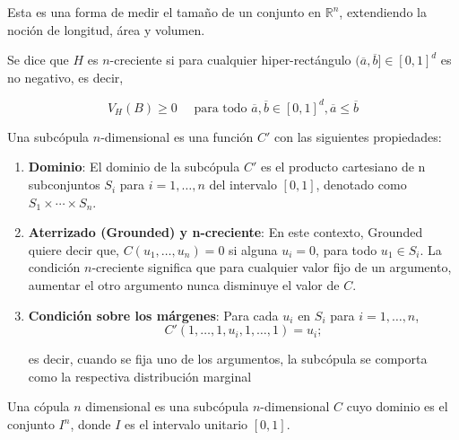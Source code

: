Esta es una forma de medir el tamaño de un conjunto en $\mathbb{R}^n$, extendiendo la noción de longitud, área y volumen.

\begin{defn}[$n$-creciente]
    Se dice que $H$ es $n$-creciente si para cualquier hiper-rectángulo $(\overline{a}, \overline{b}] \in [0, 1]^d$ es no negativo, es decir, 

    \begin{equation}
         V_H(B) \geq 0 \quad \text { para todo } \overline{a}, \overline{b} \in[0,1]^d, \overline{a} \leq \overline{b}
    \end{equation}
\end{defn}


\begin{defn}
    Una subcópula $n$-dimensional es una función $C'$ con las siguientes propiedades:

    \begin{enumerate}
        \item \textbf{Dominio}: El dominio de la subcópula $C'$ es el producto cartesiano de n subconjuntos $S_i $ para $ i = 1, \dots, n$ del intervalo $[0, 1]$, denotado como $S_1 \times \cdots \times S_n$.

        \item \textbf{Aterrizado (Grounded) y n-creciente}: En este contexto, Grounded quiere decir que, $C(u_1, \dots, u_n)=0$ si alguna $u_i = 0$, para todo $u_1 \in S_i$. 
        La condición $n$-creciente significa que para cualquier valor fijo de un argumento, aumentar el otro argumento nunca disminuye el valor de $C$.

        \item \textbf{Condición sobre los márgenes}: Para cada $u_i$ en $S_i$ para $i =  1, \dots, n$, 
        \begin{equation}
            C'(1, \dots, 1, u_i, 1, \dots,  1) = u_i;
        \end{equation}

        es decir, cuando se fija uno de los argumentos, la subcópula se comporta como la respectiva distribución marginal
    \end{enumerate}
\end{defn}


\begin{defn}
    Una cópula $n$ dimensional es una subcópula $n$-dimensional $C$ cuyo dominio es el conjunto $I^n$, donde $I$ es el intervalo unitario $[0,1]$. 
\end{defn}




